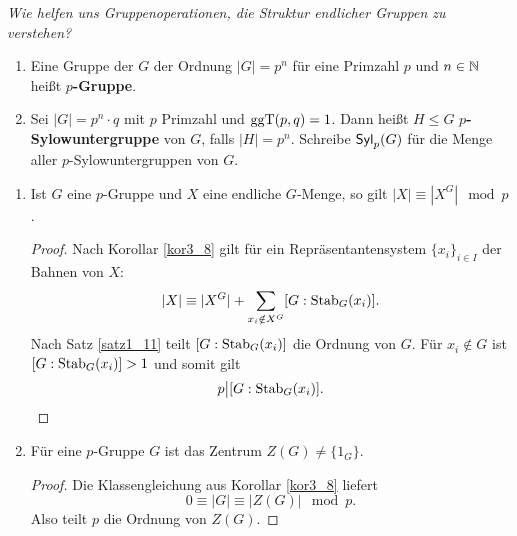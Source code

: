 \begin{center}
	\Large{\textit{Wie helfen uns Gruppenoperationen, die Struktur endlicher Gruppen zu verstehen?}}
\end{center}
\begin{definition}\label{definiton3_10}
	\begin{enumerate}[label=(\alph*)]
		\item Eine Gruppe der $G$ der Ordnung $|G| = p^n$ für eine Primzahl $p$ und $n \in \mathbb{N}$ heißt \textbf{$p$-Gruppe}.
		\item Sei $|G| = p^n \cdot q$ mit $p$ Primzahl und $\mathrm{ggT}(p,q) = 1$. Dann heißt $H \leq G$ \textbf{$p$-Sylowuntergruppe} von $G$, falls $|H| = p^n$. Schreibe $\mathsf{Syl}_p(G)$ für die Menge aller $p$-Sylowuntergruppen von $G$.
	\end{enumerate}
\end{definition}
\begin{rem}\label{rem3_11}
\begin{enumerate}[label=(\roman*)]
	\item 	Ist $G$ eine $p$-Gruppe und $X$ eine endliche $G$-Menge, so gilt $|X| \equiv |X^G| \mod p$.
	\begin{proof}
		Nach Korollar \ref{kor3_8} gilt für ein Repräsentantensystem $\{x_i\}_{i \in I}$ der Bahnen von $X$:
		\[|X| \equiv |X^G| + \sum_{x_i \notin X^G} [G : \mathrm{Stab}_G(x_i)].\]
			Nach Satz \ref{satz1_11} teilt $[G: \mathrm{Stab}_G(x_i) ]$ die Ordnung von $G$. Für $x_i \notin G$ ist $[G : \mathrm{Stab}_G(x_i)] > 1$ und somit gilt
			\[p \big| [G : \mathrm{Stab}_G(x_i)].\]
	\end{proof}
	\item Für eine $p$-Gruppe $G$ ist das Zentrum $Z(G) \neq \{1_G\}$.
	\begin{proof}
		Die Klassengleichung aus Korollar \ref{kor3_8} liefert 
		\[0 \equiv |G| \equiv |Z(G)| \mod p.\]
		Also teilt $p$ die Ordnung von $Z(G)$.
	\end{proof}	
\end{enumerate}
\end{rem}
